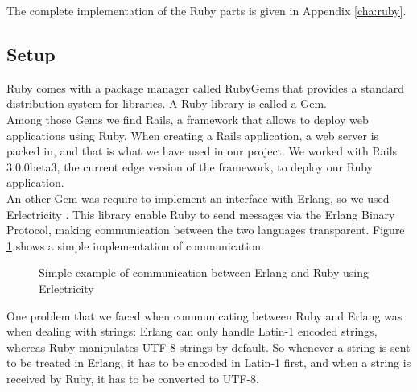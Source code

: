 The complete implementation of the Ruby parts is given in Appendix \ref{cha:ruby}.

\subsection{Setup}

Ruby comes with a package manager called RubyGems that provides a standard distribution system for libraries. A Ruby library is called a Gem.\\

Among those Gems we find Rails, a framework that allows to deploy web applications using Ruby. When creating a Rails application, a web server is packed in, and that is what we have used in our project. We worked with Rails 3.0.0beta3, the current edge version of the framework, to deploy our Ruby application.\\

An other Gem was require to implement an interface with Erlang, so we used Erlectricity \cite{Fle09}. This library enable Ruby to send messages via the Erlang Binary Protocol, making communication between the two languages transparent. Figure \ref{fig:erlectricity_example} shows a simple implementation of communication.\\

\begin{figure}[ht]
\centering
{}

\caption{Simple example of communication between Erlang and Ruby using Erlectricity }
\label{fig:erlectricity_example}
\end{figure}

One problem that we faced when communicating between Ruby and Erlang was when dealing with strings: Erlang can only handle Latin-1 encoded strings, whereas Ruby manipulates UTF-8 strings by default. So whenever a string is sent to be treated in Erlang, it has to be encoded in Latin-1 first, and when a string is received by Ruby, it has to be converted to UTF-8.\\

